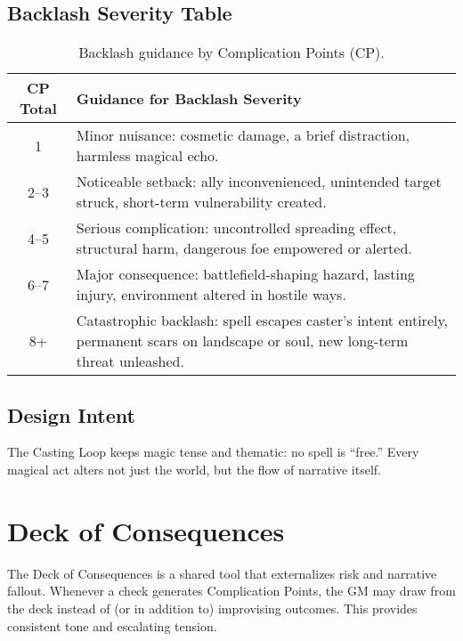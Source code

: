 \documentclass[12pt]{book}
\begin{document}
\section{Backlash Severity Table}

\begin{table}[h!]
\centering
\begin{tabular}{|c|p{10cm}|}
\hline
\textbf{CP Total} & \textbf{Guidance for Backlash Severity} \\
\hline
1 & Minor nuisance: cosmetic damage, a brief distraction, harmless magical echo. \\
\hline
2--3 & Noticeable setback: ally inconvenienced, unintended target struck, short-term vulnerability created. \\
\hline
4--5 & Serious complication: uncontrolled spreading effect, structural harm, dangerous foe empowered or alerted. \\
\hline
6--7 & Major consequence: battlefield-shaping hazard, lasting injury, environment altered in hostile ways. \\
\hline
8+ & Catastrophic backlash: spell escapes caster’s intent entirely, permanent scars on landscape or soul, new long-term threat unleashed. \\
\hline
\end{tabular}
\caption{Backlash guidance by Complication Points (CP).}
\end{table}

\section{Design Intent}
The Casting Loop keeps magic tense and thematic: no spell is “free.”  
Every magical act alters not just the world, but the flow of narrative itself.

\chapter{Deck of Consequences}

The Deck of Consequences is a shared tool that externalizes risk and narrative fallout. 
Whenever a check generates Complication Points, the GM may draw from the deck instead of (or in addition to) improvising outcomes. 
This provides consistent tone and escalating tension.
\end{document}
